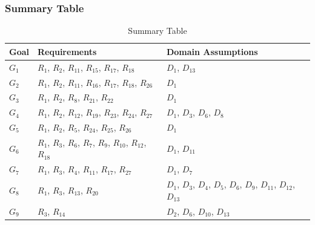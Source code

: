 \subsubsection{Summary Table}
\begin{table}[H]
    \begin{tabular}{|p{1cm}|p{7cm}|p{7cm}|}
        \hline
        \textbf{Goal} & \textbf{Requirements} & \textbf{Domain Assumptions} \\ \hline
        $G_{1}$ & $R_{1}$, $R_{2}$, $R_{11}$, $R_{15}$, $R_{17}$, $R_{18}$ & $D_{1}$, $D_{13}$\\ \hline
        $G_{2}$ & $R_{1}$, $R_{2}$, $R_{11}$, $R_{16}$, $R_{17}$, $R_{18}$, $R_{26}$ & $D_{1}$\\ \hline
        $G_{3}$ & $R_{1}$, $R_{2}$, $R_{8}$, $R_{21}$, $R_{22}$ & $D_{1}$\\ \hline
        $G_{4}$ & $R_{1}$, $R_{2}$, $R_{12}$, $R_{19}$, $R_{23}$, $R_{24}$, $R_{27}$ & $D_{1}$, $D_{3}$, $D_{6}$, $D_{8}$\\ \hline
        $G_{5}$ & $R_{1}$, $R_{2}$, $R_{5}$, $R_{24}$, $R_{25}$, $R_{26}$ & $D_{1}$\\ \hline
        $G_{6}$ & $R_{1}$, $R_{3}$, $R_{6}$, $R_{7}$, $R_{9}$, $R_{10}$, $R_{12}$, $R_{18}$ & $D_{1}$, $D_{11}$\\ \hline
        $G_{7}$ & $R_{1}$, $R_{3}$, $R_{4}$, $R_{11}$, $R_{17}$, $R_{27}$ & $D_{1}$, $D_{7}$\\ \hline
        $G_{8}$ & $R_{1}$, $R_{3}$, $R_{13}$, $R_{20}$ & $D_{1}$, $D_{3}$, $D_{4}$, $D_{5}$, $D_{6}$, $D_{9}$, $D_{11}$, $D_{12}$, $D_{13}$\\ \hline
        $G_{9}$ & $R_{3}$, $R_{14}$ & $D_{2}$, $D_{6}$, $D_{10}$, $D_{13}$\\ \hline
    \end{tabular}
    \caption{Summary Table}
\end{table}

